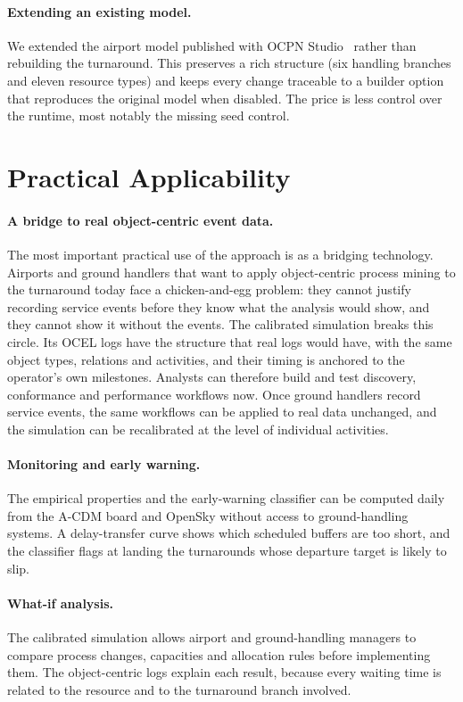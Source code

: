 \paragraph{Extending an existing model.}
We extended the airport model published with OCPN Studio~\cite{ocpn_studio} rather than rebuilding the turnaround. This preserves a rich structure (six handling branches and eleven resource types) and keeps every change traceable to a builder option that reproduces the original model when disabled. The price is less control over the runtime, most notably the missing seed control.

\section{Practical Applicability}

\paragraph{A bridge to real object-centric event data.}
The most important practical use of the approach is as a bridging technology. Airports and ground handlers that want to apply object-centric process mining to the turnaround today face a chicken-and-egg problem: they cannot justify recording service events before they know what the analysis would show, and they cannot show it without the events. The calibrated simulation breaks this circle. Its OCEL logs have the structure that real logs would have, with the same object types, relations and activities, and their timing is anchored to the operator's own milestones. Analysts can therefore build and test discovery, conformance and performance workflows now. Once ground handlers record service events, the same workflows can be applied to real data unchanged, and the simulation can be recalibrated at the level of individual activities.

\paragraph{Monitoring and early warning.}
The empirical properties and the early-warning classifier can be computed daily from the A-CDM board and OpenSky without access to ground-handling systems. A delay-transfer curve shows which scheduled buffers are too short, and the classifier flags at landing the turnarounds whose departure target is likely to slip.

\paragraph{What-if analysis.}
The calibrated simulation allows airport and ground-handling managers to compare process changes, capacities and allocation rules before implementing them. The object-centric logs explain each result, because every waiting time is related to the resource and to the turnaround branch involved.

